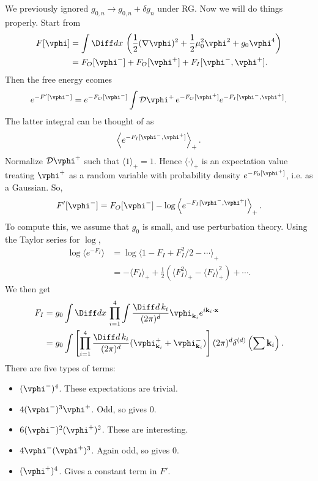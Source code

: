 \documentclass[12pt]{article}
\begin{document}
We previously ignored $g_{0,n} \to g_{0,n} + \delta g_n$ under RG. Now we will do things properly. Start from
\begin{align*}
	F[\vphi] &= \int \Diff d x \, \left( \frac{1}{2} (\nabla \vphi)^2 + \frac{1}{2} \mu_0^2 \vphi^2 + g_0 \vphi^{4} \right) \\
		 &= F_O[\vphi^{-}] + F_O[\vphi^{+}] + F_I[\vphi^{-}, \vphi^{+}].
\end{align*}
Then the free energy ecomes
\[
	e^{-F'[\vphi^{-}]} = e^{-F_O[\vphi^{-}]} \int \mathcal{D} \vphi^{+} \, e^{-F_O[\vphi^{+}]} e^{-F_I[\vphi^{-}, \vphi^{+}]}.
\]
The latter integral can be thought of as
\[
	\left \langle e^{-F_I [\vphi^{-}, \vphi^{+}]} \right \rangle_+.
\]
Normalize $\mathcal{D} \vphi^{+}$ such that $\langle 1 \rangle_+ = 1$. Hence $\langle \cdot \rangle_+$ is an expectation value treating $\vphi^{+}$ as a random variable with probability density $e^{-F_0[\vphi^{+}]}$, i.e. as a Gaussian. So,
\[
	F'[\vphi^{-}] = F_O[\vphi^{-}] - \log \left \langle e^{-F_I[\vphi^{-}, \vphi^{+}]} \right \rangle_+.
\]
To compute this, we assume that $g_0$ is small, and use perturbation theory. Using the Taylor series for $\log$,
\begin{align*}
	\log \langle e^{-F_I} \rangle &= \log \langle 1 - F_I + F_I^2/2 - \cdots \rangle_+ \\
				      &= - \langle F_I \rangle_+ + \frac{1}{2} \left( \langle F_I^2\rangle_+ - \langle F_I\rangle^2_+ \right) + \cdots.
\end{align*}
We then get
\begin{align*}
	F_I &= g_0 \int \Diff d x \, \prod_{i = 1}^4 \int \frac{\Diff d \, k_i}{(2 \pi)^d} \vphi_{\mathbf{k}_i} e^{i \mathbf{k}_i \cdot \mathbf{x}} \\
	    &= g_0 \int \left[ \prod_{i = 1}^4 \frac{\Diff d \, k_i}{(2 \pi)^d} (\vphi_{\mathbf{k}_i}^{+} + \vphi_{\mathbf{k}_i}^-) \right] (2 \pi)^d \delta^{(d)} \left( \sum \mathbf{k}_i \right).
\end{align*}
There are five types of terms:
\begin{itemize}
	\item $(\vphi^-)^{4}$. These expectations are trivial.
	\item $4(\vphi^{-})^3 \vphi^{+}$. Odd, so gives $0$.
	\item $6 (\vphi^{-})^2(\vphi^{+})^2$. These are interesting.
	\item $4 \vphi^{-} (\vphi^{+})^3$. Again odd, so gives $0$.
	\item $(\vphi^{+})^{4}$. Gives a constant term in $F'$.
\end{itemize}
\end{document}
